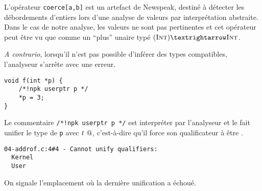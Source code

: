 L'opérateur \texttt{coerce[a,b]} est un artefact de Newspeak, destiné à détecter
les débordements d'entiers lors d'une analyse de valeurs par interprétation
abstraite. Dans le cas de notre analyse, les valeurs ne sont pas pertinentes et
cet opérateur peut être vu que comme un ``plus'' unaire typé $(\tInt) → \tInt$.

\emph{A contrario}, lorsqu'il n'est pas possible d'inférer des types
compatibles, l'analyseur s'arrête avec une erreur.

\begin{verbatim}
void f(int *p) {
    /*!npk userptr p */
    *p = 3;
}
\end{verbatim}

Le commentaire \texttt{/*!npk userptr p */} est interpréter par l'analyseur et
le fait unifier le type de \texttt{p} avec $t~@$, c'est-à-dire qu'il force
son qualificateur à être \qUser.


\begin{verbatim}
04-addrof.c:4#4 - Cannot unify qualifiers:
  Kernel
  User
\end{verbatim}

On signale l'emplacement où la dernière unification a échoué.

